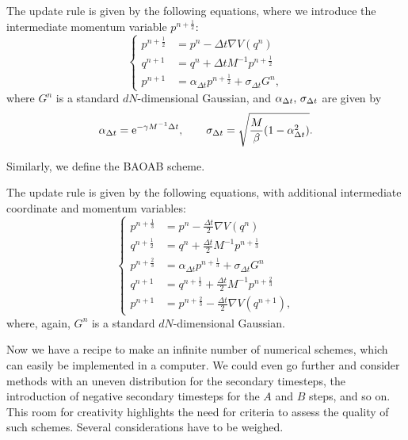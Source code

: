     \begin{example}
        The update rule is given by the following equations, where we introduce the intermediate momentum variable $p^{n+\frac12}$:
        \begin{equation}\label{bao}
            \left\{\begin{aligned}
                 p^{n+\frac12} &=p^n -\Delta t\nabla V(q^n)\\
                 q^{n+1} &=q^n + \Delta t M^{-1}p^{n+\frac 12}\\
                 p^{n+1} &= \alpha_{\Delta t}p^{n+\frac12}+\sigma_{\Delta t}G^n,
            \end{aligned}\right.
        \end{equation}
        where $G^n$ is a standard $dN$-dimensional Gaussian, and $\alpha_{{\Delta t}},\,\sigma_{{\Delta t}}$ are given by
        \begin{equation}
            \label{eq:alpha_sigma}
            \alpha_{\Delta t}=\mathrm{e}^{-\gamma M^{-1}{\Delta t}},\qquad \sigma_{\Delta t} =\sqrt{\frac{M}{\beta}(1-\alpha_{\Delta t}^2)}.
        \end{equation}
    \end{example}
    Similarly, we define the BAOAB scheme.
    \begin{example}
        The update rule is given by the following equations, with additional intermediate coordinate and momentum variables:
        \begin{equation}\label{baoab}
            \left\{\begin{aligned}
                 p^{n+\frac13} &=p^n -\frac{\Delta t}{2}\nabla V(q^n)\\
                 q^{n+\frac12} &=q^n + \frac{\Delta t}{2} M^{-1}p^{n+\frac 13}\\
                 p^{n+\frac23} &=\alpha_{\Delta t}p^{n+\frac13}+\sigma_{\Delta t}G^n\\
                 q^{n+1} &=q^{n+\frac12} + \frac{\Delta t}{2} M^{-1}p^{n+\frac 23}\\
                 p^{n+1} &= p^{n+\frac23}-\frac{\Delta t}{2}\nabla V(q^{n+1}),
            \end{aligned}\right.
        \end{equation}
        where, again, $G^n$ is a standard $dN$-dimensional Gaussian.
    \end{example}
     Now we have a recipe to make an infinite number of numerical schemes, which can easily be implemented in a computer.
     We could even go further and consider methods with an uneven distribution for the secondary timesteps, the introduction of negative secondary timesteps for the $A$ and $B$ steps, and so on.
     This room for creativity highlights the need for criteria to assess the quality of such schemes. Several considerations have to be weighed.

